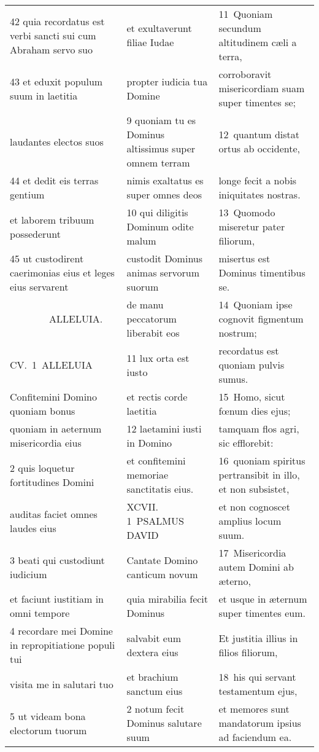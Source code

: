 \documentclass{article}
\begin{document}
\begin{longtable}{@{}p{}p{}p{}@{}}
42 quia recordatus est verbi sancti sui cum Abraham servo suo	&	et exultaverunt filiae Iudae	&	11 Quoniam secundum altitudinem cæli a terra,	\\
43 et eduxit populum suum in laetitia	&	propter iudicia tua Domine	&	corroboravit misericordiam suam super timentes se;	\\
laudantes electos suos	&	9 quoniam tu es Dominus altissimus super omnem terram	&	12 quantum distat ortus ab occidente,	\\
44 et dedit eis terras gentium	&	nimis exaltatus es super omnes deos	&	longe fecit a nobis iniquitates nostras.	\\
et laborem tribuum possederunt	&	10 qui diligitis Dominum odite malum	&	13 Quomodo miseretur pater filiorum,	\\
45 ut custodirent caerimonias eius et leges eius servarent	&	custodit Dominus animas servorum suorum	&	misertus est Dominus timentibus se.	\\
    ALLELUIA.	&	de manu peccatorum liberabit eos	&	14 Quoniam ipse cognovit figmentum nostrum;	\\
CV. 1 ALLELUIA	&	11 lux orta est iusto	&	recordatus est quoniam pulvis sumus.	\\
Confitemini Domino quoniam bonus	&	et rectis corde laetitia	&	15 Homo, sicut fœnum dies ejus;	\\
quoniam in aeternum misericordia eius	&	12 laetamini iusti in Domino	&	tamquam flos agri, sic efflorebit:	\\
2 quis loquetur fortitudines Domini	&	et confitemini memoriae sanctitatis eius.	&	16 quoniam spiritus pertransibit in illo, et non subsistet,	\\
auditas faciet omnes laudes eius	&	XCVII. 1 PSALMUS DAVID	&	et non cognoscet amplius locum suum.	\\
3 beati qui custodiunt iudicium	&	Cantate Domino canticum novum	&	17 Misericordia autem Domini ab æterno,	\\
et faciunt iustitiam in omni tempore	&	quia mirabilia fecit Dominus	&	et usque in æternum super timentes eum.	\\
4 recordare mei Domine in repropitiatione populi tui	&	salvabit eum dextera eius	&	Et justitia illius in filios filiorum,	\\
visita me in salutari tuo	&	et brachium sanctum eius	&	18 his qui servant testamentum ejus,	\\
5 ut videam bona electorum tuorum	&	2 notum fecit Dominus salutare suum	&	et memores sunt mandatorum ipsius ad faciendum ea.	\\

\end{longtable}
\end{document}
